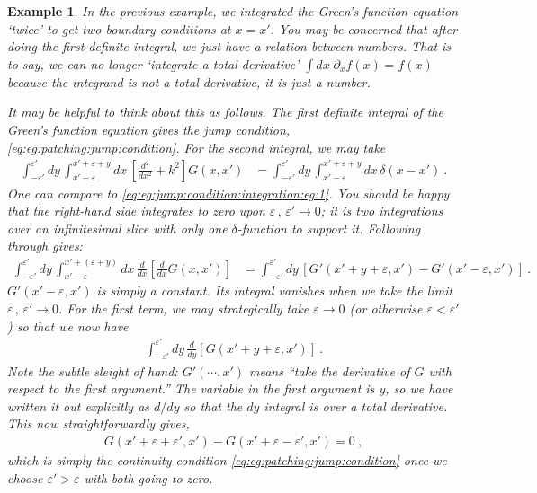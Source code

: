 \documentclass[
  11pt,
	colorful,
	raggedright,
]{tufte-style-thesis-flip}
\newtheorem{example}{Example}[section]
\begin{document}
\begin{example}%
In the previous example, we integrated the Green's function equation `twice' to get two boundary conditions at $x=x'$. You may be concerned that after doing the first definite integral, we just have a relation between numbers. That is to say, we can no longer `integrate a total derivative' $\int dx\; \partial_x f(x) = f(x)$ because the integrand is not a total derivative, it is just a number. 

It may be helpful to think about this as follows. The first definite integral of the Green's function equation gives the jump condition, \eqref{eq:eg:patching:jump:condition}. For the second integral, we may take
\begin{align}
  \int_{-\varepsilon'}^{\varepsilon'}
  dy \,
  \int_{x'-\varepsilon}^{x'+\varepsilon+y}
  dx \, 
  \left[
   \frac{d^2}{dx^2} + k^2
  \right]
  G(x,x')
  &=
  \int_{-\varepsilon'}^{\varepsilon'}
  dy \,
  \int_{x'-\varepsilon}^{x'+\varepsilon+y}
  dx \, 
  \delta (x-x') 
  \ .
\end{align}
One can compare to \eqref{eq:eg:jump:condition:integration:eg:1}. You should be happy that the right-hand side integrates to zero upon $\varepsilon\, , \, \varepsilon' \to 0$; it is two integrations over an infinitesimal slice with only one $\delta$-function to support it. Following through gives:
\begin{align}
  \int_{-\varepsilon'}^{\varepsilon'}
  dy \,
  \int_{x'-\varepsilon}^{x'+(\varepsilon+y)}
  dx \, 
  \frac{d}{dx}
  \left[
   \frac{d}{dx}
   G(x,x')
  \right]
  &=
  \int_{-\varepsilon'}^{\varepsilon'}
  dy \,
  \left[
   G'(x'+y+\varepsilon,x')
   -
   G'(x'-\varepsilon, x')
  \right] \ .
\end{align}
$G'(x'-\varepsilon, x')$ is simply a constant. Its integral vanishes when we take the limit $\varepsilon\, ,\, \varepsilon'\to 0$. For the first term, we may strategically take $\varepsilon\to 0$  (or otherwise $\varepsilon < \varepsilon'$) so that we now have
\begin{align}
  \int_{-\varepsilon'}^{\varepsilon'}
  dy \,
  \frac{d}{dy}
  \left[
   G(x'+y+\varepsilon,x')
   \right] \ .
\end{align}
Note the subtle sleight of hand: $G'(\cdots, x')$ means ``take the derivative of $G$ with respect to the first argument.'' The variable in the first argument is $y$, so we have written it out explicitly as $d/dy$ so that the $dy$ integral is over a total derivative. This now straightforwardly gives, 
\begin{align}
  G(x'+\varepsilon+\varepsilon', x') 
  -
  G(x'+\varepsilon-\varepsilon', x') 
  = 0 \ ,
\end{align}
which is simply the continuity condition \eqref{eq:eg:patching:jump:condition} once we choose $\varepsilon' > \varepsilon$ with both going to zero.
\end{example}
\end{document}

